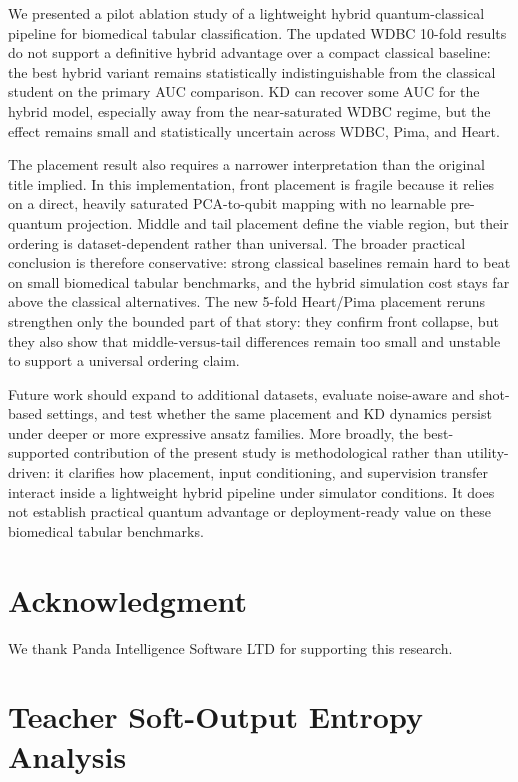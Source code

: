 \documentclass[11pt,a4paper]{article}
\begin{document}
We presented a pilot ablation study of a lightweight hybrid quantum-classical pipeline for
biomedical tabular classification. The updated WDBC 10-fold results do not support a definitive
hybrid advantage over a compact classical baseline: the best hybrid variant remains statistically
indistinguishable from the classical student on the primary AUC comparison. KD can recover some AUC
for the hybrid model, especially away from the near-saturated WDBC regime, but the effect remains
small and statistically uncertain across WDBC, Pima, and Heart.

The placement result also requires a narrower interpretation than the original title implied. In
this implementation, front placement is fragile because it relies on a direct, heavily saturated
PCA-to-qubit mapping with no learnable pre-quantum projection. Middle and tail placement define the
viable region, but their ordering is dataset-dependent rather than universal. The broader practical
conclusion is therefore conservative: strong classical baselines remain hard to beat on small
biomedical tabular benchmarks, and the hybrid simulation cost stays far above the classical
alternatives. The new 5-fold Heart/Pima placement reruns strengthen only the bounded part of that
story: they confirm front collapse, but they also show that middle-versus-tail differences remain too
small and unstable to support a universal ordering claim.

Future work should expand to additional datasets, evaluate noise-aware and shot-based settings, and
test whether the same placement and KD dynamics persist under deeper or more expressive ansatz
families. More broadly, the best-supported contribution of the present study is methodological rather
than utility-driven: it clarifies how placement, input conditioning, and supervision transfer
interact inside a lightweight hybrid pipeline under simulator conditions. It does not establish
practical quantum advantage or deployment-ready value on these biomedical tabular benchmarks.

\section*{Acknowledgment}
We thank Panda Intelligence Software LTD for supporting this research.

\appendix

\section{Teacher Soft-Output Entropy Analysis}
\label{app:entropy}
\end{document}
